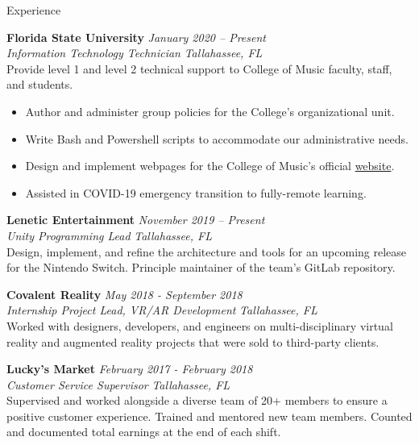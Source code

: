 \documentclass{resume} %
\begin{document}
	\begin{rSection}{Experience}
		
		{\bf Florida State University} \hfill {\em January 2020 – Present} \\
		\textit{Information Technology Technician} \hfill {\em Tallahassee, FL} \smallskip \\
		Provide level 1 and level 2 technical support to College of Music faculty, staff, and students.
		\begin{itemize}
			\vspace{-0.2cm}
			\item Author and administer group policies for the College's organizational unit. \vspace{-0.2cm} \item Write Bash and Powershell scripts to accommodate our administrative needs. 
			\vspace{-0.2cm}\item Design and implement webpages for the College of Music's official \href{https://music.fsu.edu/online-audition-forms}{ website}.
			\vspace{-0.2cm}\item Assisted in COVID-19 emergency transition to fully-remote learning.
		\end{itemize}
		{\bf Lenetic Entertainment} \hfill {\em November 2019 – Present}\\
		\textit{Unity Programming Lead} \hfill {\em Tallahassee, FL} \smallskip \\
		Design, implement, and refine the architecture and tools for an upcoming release for the Nintendo Switch. Principle maintainer of the team's GitLab repository.
		
		{\bf Covalent Reality} \hfill {\em May 2018 - September 2018}\\
		\textit{Internship Project Lead, VR/AR Development} \hfill {\em Tallahassee, FL} \smallskip \\
		Worked with designers, developers, and engineers on multi-disciplinary virtual reality and augmented reality projects that were sold to third-party clients.
		
		{\bf Lucky's Market} \hfill {\em February 2017 - February 2018}\\
		\textit{Customer Service Supervisor} \hfill {\em Tallahassee, FL} \smallskip \\
		Supervised and worked alongside a diverse team of 20+ members to ensure a positive customer experience. Trained and mentored new team members. Counted and documented total earnings at the end of each shift.
		

\end{rSection}
\end{document}
